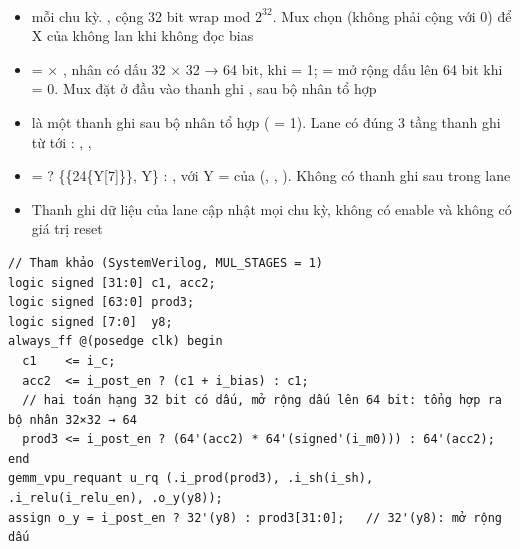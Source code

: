 \documentclass[10pt,a4paper]{article}
\begin{document}
\paragraph{}\label{par:5-2}
\begin{itemize}
\item {} mỗi chu kỳ. , cộng 32 bit wrap mod $2^{32}$. Mux chọn  (không phải cộng với 0) để X của  không lan khi không đọc bias
\item {} =  × , nhân có dấu 32 × 32 → 64 bit, khi  = 1; =  mở rộng dấu lên 64 bit khi  = 0. Mux đặt ở đầu vào thanh ghi , sau bộ nhân tổ hợp
\item {} là một thanh ghi sau bộ nhân tổ hợp ( = 1). Lane có đúng 3 tầng thanh ghi từ  tới : , , 
\item {} =  ? \{\{24\{Y[7]\}\}, Y\} : , với Y =  của (, , ). Không có thanh ghi sau  trong lane
\item Thanh ghi dữ liệu của lane cập nhật mọi chu kỳ, không có enable và không có giá trị reset
\end{itemize}

\begin{Verbatim}[frame=leftline,framerule=2pt,rulecolor=\color{brand},xleftmargin=6pt,samepage=true]
// Tham khảo (SystemVerilog, MUL_STAGES = 1)
logic signed [31:0] c1, acc2;
logic signed [63:0] prod3;
logic signed [7:0]  y8;
always_ff @(posedge clk) begin
  c1    <= i_c;
  acc2  <= i_post_en ? (c1 + i_bias) : c1;
  // hai toán hạng 32 bit có dấu, mở rộng dấu lên 64 bit: tổng hợp ra bộ nhân 32×32 → 64
  prod3 <= i_post_en ? (64'(acc2) * 64'(signed'(i_m0))) : 64'(acc2);
end
gemm_vpu_requant u_rq (.i_prod(prod3), .i_sh(i_sh), .i_relu(i_relu_en), .o_y(y8));
assign o_y = i_post_en ? 32'(y8) : prod3[31:0];   // 32'(y8): mở rộng dấu
\end{Verbatim}

\subsubsection{\texorpdfstring{}{gemm\_vpu\_requant}}\label{sec:5.2}
\end{document}

